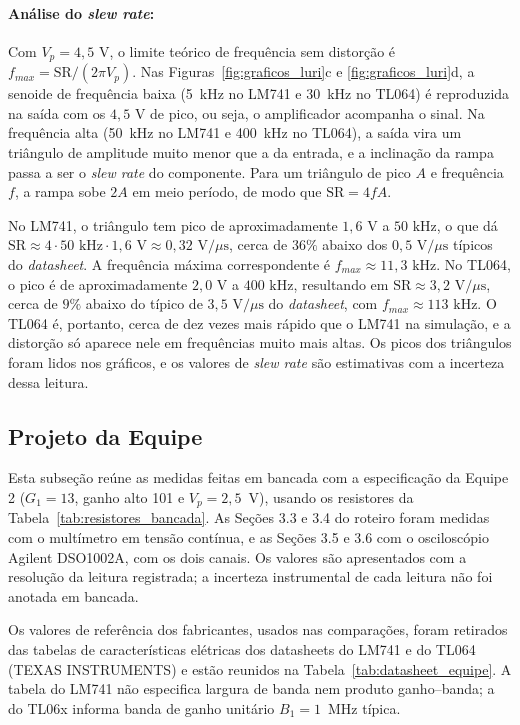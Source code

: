 \documentclass[11pt,a4paper]{article}
\begin{document}
\paragraph{Análise do \textit{slew rate}:}
Com $V_p=4{,}5\text{ V}$, o limite teórico de frequência sem distorção é $f_{max}=\mathrm{SR}/(2\pi V_p)$. Nas Figuras~\ref{fig:graficos_luri}c e \ref{fig:graficos_luri}d, a senoide de frequência baixa (5~kHz no LM741 e 30~kHz no TL064) é reproduzida na saída com os $4{,}5\text{ V}$ de pico, ou seja, o amplificador acompanha o sinal. Na frequência alta (50~kHz no LM741 e 400~kHz no TL064), a saída vira um triângulo de amplitude muito menor que a da entrada, e a inclinação da rampa passa a ser o \textit{slew rate} do componente. Para um triângulo de pico $A$ e frequência $f$, a rampa sobe $2A$ em meio período, de modo que $\mathrm{SR}=4fA$.

No LM741, o triângulo tem pico de aproximadamente $1{,}6\text{ V}$ a $50\text{ kHz}$, o que dá $\mathrm{SR}\approx4\cdot50\text{ kHz}\cdot1{,}6\text{ V}\approx0{,}32\text{ V/}\mu\text{s}$, cerca de $36\%$ abaixo dos $0{,}5\text{ V/}\mu\text{s}$ típicos do \textit{datasheet}. A frequência máxima correspondente é $f_{max}\approx11{,}3\text{ kHz}$. No TL064, o pico é de aproximadamente $2{,}0\text{ V}$ a $400\text{ kHz}$, resultando em $\mathrm{SR}\approx3{,}2\text{ V/}\mu\text{s}$, cerca de $9\%$ abaixo do típico de $3{,}5\text{ V/}\mu\text{s}$ do \textit{datasheet}, com $f_{max}\approx113\text{ kHz}$. O TL064 é, portanto, cerca de dez vezes mais rápido que o LM741 na simulação, e a distorção só aparece nele em frequências muito mais altas. Os picos dos triângulos foram lidos nos gráficos, e os valores de \textit{slew rate} são estimativas com a incerteza dessa leitura.


\subsection{Projeto da Equipe}

Esta subseção reúne as medidas feitas em bancada com a especificação da Equipe 2 ($G_1=13$, ganho alto 101 e $V_p=2{,}5$~V), usando os resistores da Tabela~\ref{tab:resistores_bancada}. As Seções 3.3 e 3.4 do roteiro foram medidas com o multímetro em tensão contínua, e as Seções 3.5 e 3.6 com o osciloscópio Agilent DSO1002A, com os dois canais. Os valores são apresentados com a resolução da leitura registrada; a incerteza instrumental de cada leitura não foi anotada em bancada.

Os valores de referência dos fabricantes, usados nas comparações, foram retirados das tabelas de características elétricas dos datasheets do LM741 e do TL064 (TEXAS INSTRUMENTS) e estão reunidos na Tabela~\ref{tab:datasheet_equipe}. A tabela do LM741 não especifica largura de banda nem produto ganho--banda; a do TL06x informa banda de ganho unitário $B_1=1$~MHz típica.
\end{document}
